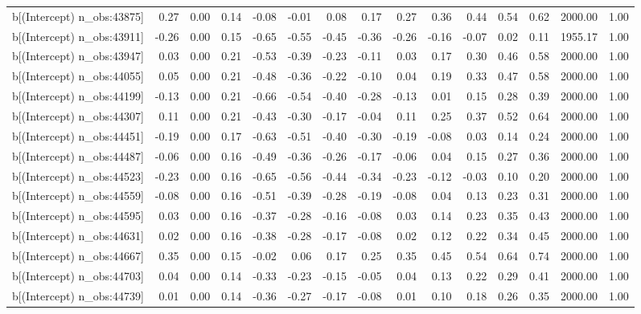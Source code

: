 \begin{table}[ht]
\begin{tabular}{rrrrrrrrrrrrrrr}
  b[(Intercept) n\_obs:43875] & 0.27 & 0.00 & 0.14 & -0.08 & -0.01 & 0.08 & 0.17 & 0.27 & 0.36 & 0.44 & 0.54 & 0.62 & 2000.00 & 1.00 \\ 
  b[(Intercept) n\_obs:43911] & -0.26 & 0.00 & 0.15 & -0.65 & -0.55 & -0.45 & -0.36 & -0.26 & -0.16 & -0.07 & 0.02 & 0.11 & 1955.17 & 1.00 \\ 
  b[(Intercept) n\_obs:43947] & 0.03 & 0.00 & 0.21 & -0.53 & -0.39 & -0.23 & -0.11 & 0.03 & 0.17 & 0.30 & 0.46 & 0.58 & 2000.00 & 1.00 \\ 
  b[(Intercept) n\_obs:44055] & 0.05 & 0.00 & 0.21 & -0.48 & -0.36 & -0.22 & -0.10 & 0.04 & 0.19 & 0.33 & 0.47 & 0.58 & 2000.00 & 1.00 \\ 
  b[(Intercept) n\_obs:44199] & -0.13 & 0.00 & 0.21 & -0.66 & -0.54 & -0.40 & -0.28 & -0.13 & 0.01 & 0.15 & 0.28 & 0.39 & 2000.00 & 1.00 \\ 
  b[(Intercept) n\_obs:44307] & 0.11 & 0.00 & 0.21 & -0.43 & -0.30 & -0.17 & -0.04 & 0.11 & 0.25 & 0.37 & 0.52 & 0.64 & 2000.00 & 1.00 \\ 
  b[(Intercept) n\_obs:44451] & -0.19 & 0.00 & 0.17 & -0.63 & -0.51 & -0.40 & -0.30 & -0.19 & -0.08 & 0.03 & 0.14 & 0.24 & 2000.00 & 1.00 \\ 
  b[(Intercept) n\_obs:44487] & -0.06 & 0.00 & 0.16 & -0.49 & -0.36 & -0.26 & -0.17 & -0.06 & 0.04 & 0.15 & 0.27 & 0.36 & 2000.00 & 1.00 \\ 
  b[(Intercept) n\_obs:44523] & -0.23 & 0.00 & 0.16 & -0.65 & -0.56 & -0.44 & -0.34 & -0.23 & -0.12 & -0.03 & 0.10 & 0.20 & 2000.00 & 1.00 \\ 
  b[(Intercept) n\_obs:44559] & -0.08 & 0.00 & 0.16 & -0.51 & -0.39 & -0.28 & -0.19 & -0.08 & 0.04 & 0.13 & 0.23 & 0.31 & 2000.00 & 1.00 \\ 
  b[(Intercept) n\_obs:44595] & 0.03 & 0.00 & 0.16 & -0.37 & -0.28 & -0.16 & -0.08 & 0.03 & 0.14 & 0.23 & 0.35 & 0.43 & 2000.00 & 1.00 \\ 
  b[(Intercept) n\_obs:44631] & 0.02 & 0.00 & 0.16 & -0.38 & -0.28 & -0.17 & -0.08 & 0.02 & 0.12 & 0.22 & 0.34 & 0.45 & 2000.00 & 1.00 \\ 
  b[(Intercept) n\_obs:44667] & 0.35 & 0.00 & 0.15 & -0.02 & 0.06 & 0.17 & 0.25 & 0.35 & 0.45 & 0.54 & 0.64 & 0.74 & 2000.00 & 1.00 \\ 
  b[(Intercept) n\_obs:44703] & 0.04 & 0.00 & 0.14 & -0.33 & -0.23 & -0.15 & -0.05 & 0.04 & 0.13 & 0.22 & 0.29 & 0.41 & 2000.00 & 1.00 \\ 
  b[(Intercept) n\_obs:44739] & 0.01 & 0.00 & 0.14 & -0.36 & -0.27 & -0.17 & -0.08 & 0.01 & 0.10 & 0.18 & 0.26 & 0.35 & 2000.00 & 1.00 \\ 

\end{tabular}
\end{table}
